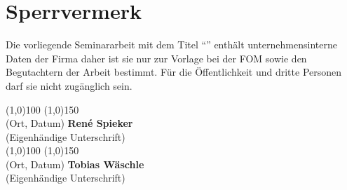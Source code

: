 \section*{Sperrvermerk}
Die vorliegende Seminararbeit mit dem Titel ``\MyTitel{}'' enthält unternehmensinterne Daten der Firma \MyFirma{} daher ist sie nur zur Vorlage bei der FOM sowie den Begutachtern der Arbeit bestimmt. Für die Öffentlichkeit und dritte Personen darf sie nicht zugänglich sein.
\\[3cm]
\begin{flushright}
\line(1,0){100} \hfill \line(1,0){150}\\
(Ort, Datum) \hfill \textbf{René Spieker}\\
(Eigenhändige Unterschrift)\\[1.5cm]
\line(1,0){100} \hfill \line(1,0){150}\\
(Ort, Datum) \hfill \textbf{Tobias Wäschle}\\
(Eigenhändige Unterschrift)


\end{flushright}